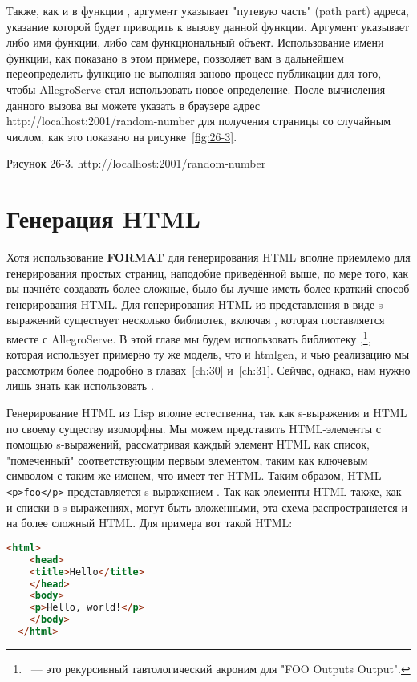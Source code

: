 Также, как и в функции , аргумент  указывает "путевую часть" (path part) адреса, указание которой будет приводить к вызову данной функции.  Аргумент  указывает либо имя функции, либо сам функциональный объект. Использование имени функции, как показано в этом примере, позволяет вам в дальнейшем переопределить функцию не выполняя заново процесс публикации для того, чтобы AllegroServe стал использовать новое определение. После вычисления данного вызова вы можете указать в браузере адрес http://localhost:2001/random-number для получения страницы со случайным числом, как это показано на рисунке~\ref{fig:26-3}.

Рисунок 26-3. http://localhost:2001/random-number

\section{Генерация HTML}

Хотя использование \textbf{FORMAT} для генерирования HTML вполне приемлемо для
генерирования простых страниц, наподобие приведённой выше, по мере того, как вы начнёте
создавать более сложные, было бы лучше иметь более краткий способ генерирования HTML. Для
генерирования HTML из представления в виде s-выражений существует несколько библиотек,
включая , которая поставляется вместе с AllegroServe. В этой главе мы будем
использовать библиотеку ,\footnote{~--- это рекурсивный тавтологический
  акроним для "FOO Outputs Output".}, которая использует примерно ту же модель, что и
htmlgen, и чью реализацию мы рассмотрим более подробно в главах~\ref{ch:30}
и~\ref{ch:31}. Сейчас, однако, нам нужно лишь знать как использовать .

Генерирование HTML из Lisp вполне естественна, так как s-выражения и HTML по своему
существу изоморфны. Мы можем представить HTML-элементы с помощью s-выражений, рассматривая
каждый элемент HTML как список, "помеченный" соответствующим первым элементом, таким как
ключевым символом с таким же именем, что имеет тег HTML. Таким образом, HTML
\lstinline!<p>foo</p>! представляется s-выражением . Так как элементы
HTML также, как и списки в s-выражениях, могут быть вложенными, эта схема распространяется
и на более сложный HTML. Для примера вот такой HTML:

\begin{lstlisting}[language=HTML]
  <html>
    <head>
    <title>Hello</title>
    </head>
    <body>
    <p>Hello, world!</p>
    </body>
  </html>
\end{lstlisting}

